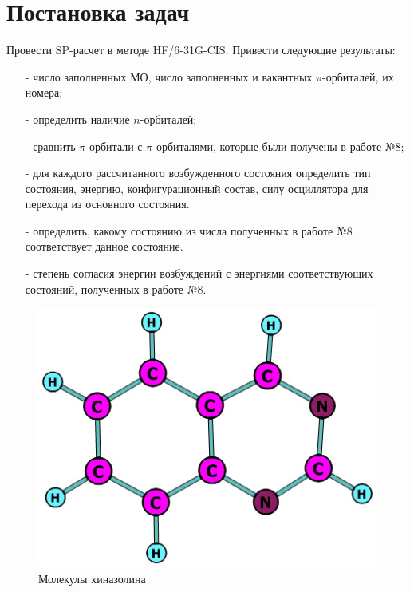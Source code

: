 \section{Постановка задач}
Провести SP-расчет в методе HF/6-31G-CIS. Привести следующие результаты:
\begin{itemize}
    \item[-] число заполненных МО, число заполненных и вакантных $\pi$-орбиталей, их номера;
    \item[-] определить наличие $n$-орбиталей;
    \item[-] сравнить $\pi$-орбитали с $\pi$-орбиталями, которые были получены в работе №8;
    \item[-] для каждого рассчитанного возбужденного состояния определить тип состояния, энергию, конфигурационный состав, силу осциллятора для перехода из основного состояния.
    \item[-] определить, какому состоянию из числа полученных в работе №8 соответствует данное состояние.
    \item[-] степень согласия энергии возбуждений с энергиями соответствующих состояний, полученных в работе №8.  
\end{itemize}

\begin{figure}[H]
\centering
\captionsetup{justification=centering}
\includegraphics[scale=0.4]{fig/1.jpg}
\caption{Молекулы хиназолина}
\end{figure}